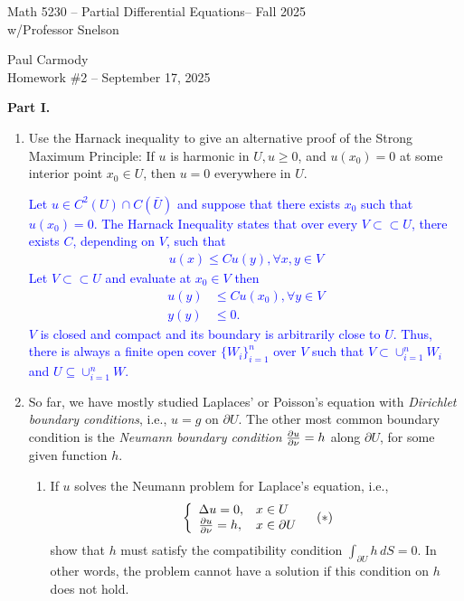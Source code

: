 \documentclass[10pt,a4paper]{report}
\newcommand{\CLASSNAME}{Math 5230 -- Partial Differential Equations}
\newcommand{\STUDENTNAME}{Paul Carmody}
\newcommand{\ASSIGNMENT}{Homework \#2 }
\newcommand{\DUEDATE}{September 17, 2025}
\newcommand{\SEMESTER}{Fall 2025}
\newcommand{\BLUE}[1]{\textcolor{blue}{#1}}
\begin{document}
\begin{center}
	\Large{\CLASSNAME -- \SEMESTER} \\
	\large{ w/Professor Snelson}
\end{center}
\begin{center}
	\STUDENTNAME \\
	\ASSIGNMENT -- \DUEDATE\\
\end{center} 

\begin{description}
	\item \textbf{Part I.}
	
	\begin{enumerate}[label=\arabic*]
	
		\item Use the Harnack inequality to give an alternative proof of the Strong Maximum Principle: If $u$ is harmonic in $U, u\ge 0$, and $u(x_0)=0$ at some interior point $x_0\in U$, then $u=0$ everywhere in $U$.
		
		\BLUE{Let $u \in C^2(U)\cap C(\bar U)$ and suppose that there exists $x_0$ such that $u(x_0)= 0$.  The Harnack Inequality states that over every $V \subset\subset U$, there exists $C$, depending on $V$, such that
		\begin{align*}
			u(x) \le Cu(y), \forall x,y\in V
		\end{align*}Let $V \subset\subset U$ and evaluate at $x_0 \in V$ then
		\begin{align*}
			u(y) &\le Cu(x_0), \forall y \in V \\
			y(y)  &\le 0.
		\end{align*}$V$ is closed and compact and its boundary is arbitrarily close to $U$.  Thus, there is always a finite open cover $\{W_i\}_{i=1}^n$ over $V$ such that $V \subset \cup_{i=1}^n W_i$ and $U \subseteq \cup_{i=1}^n W$.
		}
		
		\item So far, we have mostly studied Laplaces' or Poisson's equation with \textit{Dirichlet boundary conditions}, i.e., $u=g$ on $\partial U$.  The other most common boundary condition is the \textit{Neumann boundary condition} $\frac{\partial u}{\partial \nu} = h$ along $\partial U$, for some given function $h$.
		\begin{enumerate}[label=(\alph*)]
		
			\item If $u$ solves the Neumann problem for Laplace's equation, i.e., 
			\begin{align*}
				&\left \{ \begin{array}{ll} \Delta u=0, & x \in U\\ \frac{\partial u}{\partial \nu}=h, & x \in \partial U \end{array} \right . & (*)
			\end{align*}show that $h$ must satisfy the compatibility condition $\int_{\partial U} h\, dS = 0$.  In other words, the problem cannot have a solution if this condition on $h$ does not hold.
			

\end{enumerate}
\end{enumerate}
\end{description}
\end{document}
